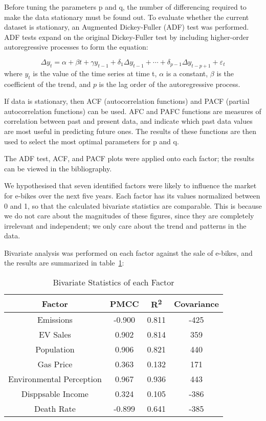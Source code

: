 Before tuning the parameters p and q, the number of differencing required to make the
data stationary must be found out. To evaluate whether the current dataset is stationary, an
Augmented Dickey-Fuller (ADF) test was performed.
ADF tests expand on the original Dickey-Fuller test by including higher-order autoregressive
processes to form the equation:


\begin{equation}
    \Delta y_{t}=\alpha +\beta t+\gamma y_{t-1}+\delta _{1}\Delta y_{t-1}+\cdots +\delta _{p-1}\Delta y_{t-p+1}+\varepsilon _{t}
\end{equation}
%
where
${y_{t}}$ is the value of the time series at time t,
${\alpha}$ is a constant,
${\beta}$ is the coefficient of the trend, and
$p$ is the lag order of the autoregressive process.

If data is stationary, then ACF (autocorrelation functions) and PACF (partial autocorrelation functions) can be used.
AFC and PAFC functions are measures of correlation between past
and present data, and indicate which past data values are most useful in predicting future
ones. The results of these functions are then used to select the most optimal parameters for
p and q.

The ADF test, ACF, and PACF plots were applied onto each factor; the results can be viewed in the bibliography.

We hypothesised that seven identified factors were likely to influence the market for e-bikes over the next five years.
Each factor has its values normalized between 0 and 1, so that the calculated bivariate statistics are comparable.
This is because we do not care about the magnitudes of these figures, since they are completely irrelevant and independent; we only care about the trend and patterns in the data.

Bivariate analysis was performed on each factor against the sale of e-bikes, and the results are summarized in table~\ref{tab:factor_bivar}:

\begin{table}[h!]
    \centering
    \caption{Bivariate Statistics of each Factor}
    \begin{tabular}{cccc}
        \toprule
        Factor & PMCC & R\textsuperscript{2} & Covariance      \\
        \midrule
        Emissions   & -0.900 & 0.811 & -425    \\
        EV Sales & 0.902 & 0.814 & 359     \\
        Population & 0.906 & 0.821 & 440 \\
        Gas Price & 0.363 & 0.132 & 171 \\
        Environmental Perception & 0.967 & 0.936 & 443 \\
        Disppsable Income & 0.324 & 0.105 & -386 \\
        Death Rate & -0.899 & 0.641 & -385 \\
        \bottomrule
    \end{tabular}
    \label{tab:factor_bivar}
\end{table}

